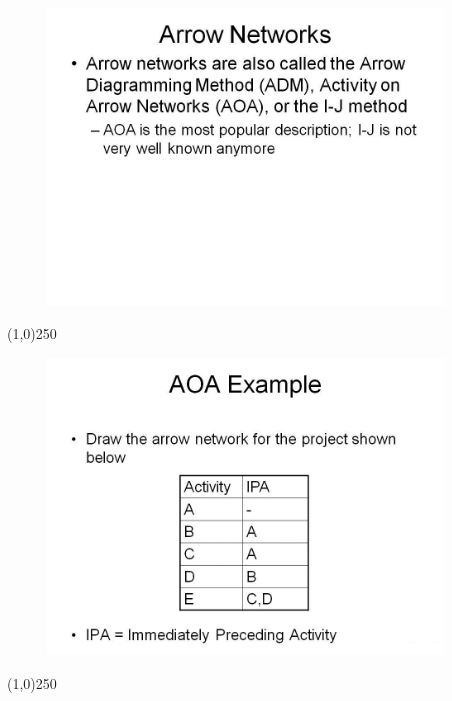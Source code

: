 \begin{frame}
\begin{figure}
	\centering
		\includegraphics[width = 10.5cm]{oldnotes/Slide45.jpg}
\end{figure}
\end{frame}
\begin{center}\line(1,0){250}\end{center}





\begin{frame}
\begin{figure}
	\centering
		\includegraphics[width = 10.5cm]{oldnotes/Slide46.jpg}
\end{figure}
\end{frame}
\begin{center}\line(1,0){250}\end{center}





